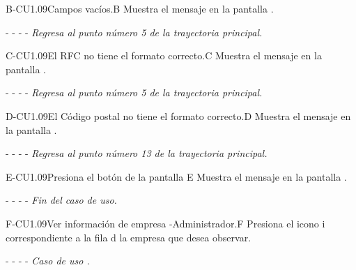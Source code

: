 	\begin{UCtrayectoriaA}{B-CU1.09}{Campos vacíos.}{B}
	    \UCpaso[\UCsist]Muestra el mensaje en la pantalla .
	    \item[- -] - - {\em Regresa al punto número 5 de la trayectoria principal.}
	\end{UCtrayectoriaA}

    

	\begin{UCtrayectoriaA}{C-CU1.09}{El RFC no tiene el formato correcto.}{C}
			\UCpaso[\UCsist] Muestra el mensaje  en la pantalla .
			\item[- -] - - {\em Regresa al punto número 5 de la trayectoria principal.} 
    \end{UCtrayectoriaA}
    
	\begin{UCtrayectoriaA}{D-CU1.09}{El Código postal no tiene el formato correcto.}{D}
			\UCpaso[\UCsist] Muestra el mensaje  en la pantalla .
			\item[- -] - - {\em Regresa al punto número 13 de la trayectoria principal.} 
    \end{UCtrayectoriaA}
    
	\begin{UCtrayectoriaA}{E-CU1.09}{Presiona el botón  de la pantalla }{E}
		\UCpaso[\UCsist] Muestra el mensaje  en la pantalla .
		\item[- -] - - {\em Fin del caso de uso.} 
	\end{UCtrayectoriaA}
  \begin{UCtrayectoriaA}{F-CU1.09}{Ver información de empresa -Administrador.}{F}
	     \UCpaso[\UCactor]Presiona el icono \textcircled{i} correspondiente a la fila d la empresa que desea observar.
	    \item[- -] - - {\em Caso de uso .}
	\end{UCtrayectoriaA}
	
